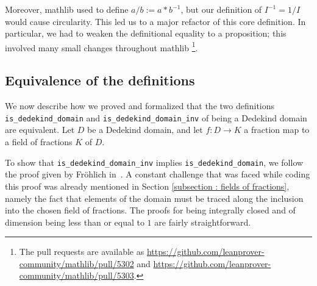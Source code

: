 \documentclass[sn-mathphys]{sn-jnl}%
\newcommand{\lean}[1]{\texttt{#1}\xspace}
\newcommand{\mathlib}{\textsf{mathlib}\xspace}
\begin{document}
Moreover, \mathlib used to define \lean{$a / b := a * b^{-1}$}, but our definition of $I^{-1} = 1 / I$ would cause circularity. This led us to a major refactor of this core definition. In particular, we had to weaken the definitional equality to a proposition; this involved many small changes throughout \mathlib
\footnote{The pull requests are available as \url{https://github.com/leanprover-community/mathlib/pull/5302} and \url{https://github.com/leanprover-community/mathlib/pull/5303}.}.

\subsection{Equivalence of the definitions} \label{sec:equivalence}
We now describe how we proved and formalized that the two definitions \lean{is\_dedekind\_domain} and \lean{is\_dedekind\_domain\_inv} of being a Dedekind domain are equivalent. Let $D$ be a Dedekind domain, and let $f\colon D\to K$ a fraction map to a field of fractions $K$ of $D$.

To show that \lean{is\_dedekind\_domain\_inv} implies \lean{is\_dedekind\_domain}, we follow the proof given by Fr\"ohlich in~\cite[Chapter 1, Section~2, Proposition~1.2.1]{frohlich}. A constant challenge that was faced while coding this proof was already mentioned in Section \ref{subsection : fields of fractions}, namely the fact that elements of the domain must be traced along the inclusion into the chosen field of fractions.
The proofs for being integrally closed and of dimension being less than or equal to $1$ are fairly straightforward.
\end{document}

